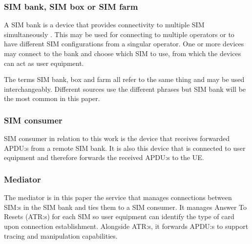 \subsubsection{SIM bank, SIM box or SIM farm}

A SIM bank is a device that provides connectivity to multiple SIM
simultaneously \cite{hyprms-sim-bank}. This may be used for
connecting to multiple operators or to have different SIM
configurations from a singular operator. One or more devices may
connect to the bank and choose which SIM to use, from which the
devices can act as user equipment.

The terms SIM bank, box and farm all refer to the same thing and
may be used interchangeably. Different sources use the different
phrases but SIM bank will be the most common in this paper.

\subsubsection{SIM consumer}

SIM consumer in relation to this work is the device that receives
forwarded APDU:s from a remote SIM bank. It is also this device
that is connected to user equipment and therefore forwards the
received APDU:s to the UE.

\subsubsection{Mediator}

The mediator is in this paper the service that manages connections
between SIM:s in the SIM bank and ties them to a SIM consumer. It
manages Answer To Resets (ATR:s) for each SIM so user equipment
can identify the type of card upon connection establishment.
Alongside ATR:s, it forwards APDU:s to support tracing and
manipulation capabilities.
